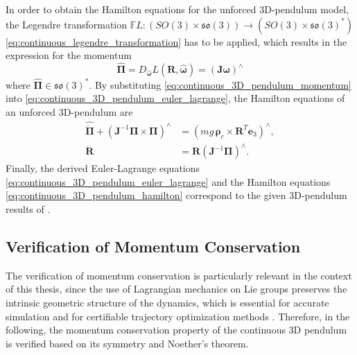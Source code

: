 In order to obtain the Hamilton equations for the unforced 3D-pendulum model, the Legendre transformation $\mathbb{F}L:(SO(3)\times\mathfrak{so}(3)) \to (SO(3) \times \mathfrak{so}(3)^*)$ \eqref{eq:continuous_legendre_transformation} has to be applied, which results in the expression for the momentum
\begin{equation}  \label{eq:continuous_3D_pendulum_momentum}
    \hat{\bm{\Pi}} = D_{\hat{\bm{\omega}}}L(\bm{R},\hat{\bm{\omega}}) = (\bm{J}\bm{\omega})^\wedge
\end{equation}
where $ \hat{\bm{\Pi}} \in \mathfrak{so}(3)^*$. By substituting \eqref{eq:continuous_3D_pendulum_momentum} into \eqref{eq:continuous_3D_pendulum_euler_lagrange}, the Hamilton equations of an unforced 3D-pendulum are 
\begin{subequations}\label{eq:continuous_3D_pendulum_hamilton}
\begin{align}
    \hat{\dot{\bm{\Pi}}} + (\bm{J}^{-1}\bm{\Pi} \times \bm{\Pi})^\wedge &= (mg\,\bm{\rho}_c \times \bm{R}^T \bm{e}_3)^\wedge,
    \label{eq:continuous_3D_pendulum_hamilton_momentum} \\
    \dot{\bm{R}} &= \bm{R}(\bm{J}^{-1}\bm{\Pi})^\wedge.
    \label{eq:continuous_3D_pendulum_hamilton_kinematics}
\end{align}
\end{subequations}
Finally, the derived Euler-Lagrange equations \eqref{eq:continuous_3D_pendulum_euler_lagrange} and the Hamilton equations \eqref{eq:continuous_3D_pendulum_hamilton} correspond to the given 3D-pendulum results of \cite{Lee2008}.

\subsection{Verification of Momentum Conservation}
\label{sec:continuous_3D_pendulum_momentum_validation}

The verification of momentum conservation is particularly relevant in the context of this thesis, since the use of Lagrangian mechanics on Lie groups preserves the intrinsic geometric structure of the dynamics, which is essential for accurate simulation and for certifiable trajectory optimization methods \cite{Sangli2025}. Therefore, in the following, the momentum conservation property of the continuous 3D pendulum is verified based on its symmetry and Noether's theorem.

